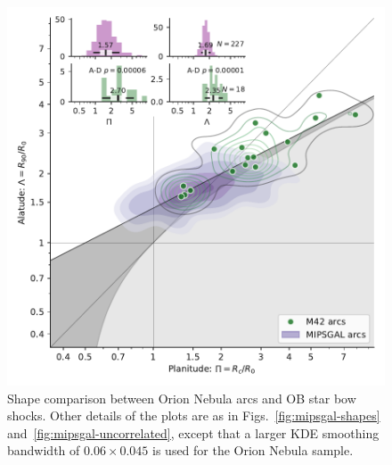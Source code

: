 \begin{figure}
  \centering
  \includegraphics[width=\linewidth]{figs/mipsgal-Rc-R90-vs-Orion}
  \caption[]{Shape comparison between Orion Nebula arcs and OB star
    bow shocks.  Other details of the plots are as in
    Figs.~\ref{fig:mipsgal-shapes} and~\ref{fig:mipsgal-uncorrelated},
    except that a larger KDE smoothing bandwidth of
    \(0.06 \times 0.045\) is used for the Orion Nebula sample.}
  \label{fig:ll-compare-mipsgal}
\end{figure}


